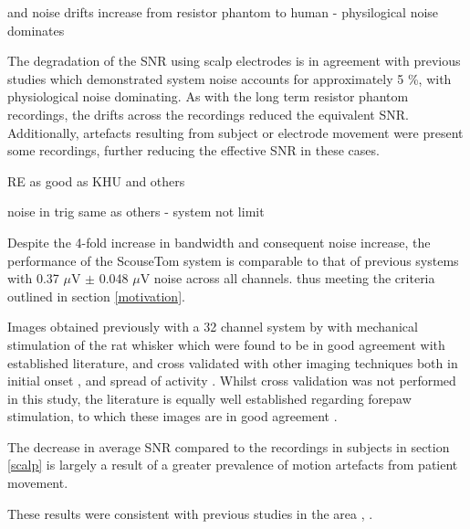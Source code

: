 and noise drifts increase from resistor phantom to human - physilogical noise dominates


 The degradation of the SNR using scalp electrodes is in agreement with previous studies \cite{fabrizi2007analysis} which demonstrated system noise accounts for approximately 5 \%, with physiological noise dominating. As with the long term resistor phantom recordings, the drifts across the recordings reduced the equivalent SNR. Additionally, artefacts resulting from subject or electrode movement were present some recordings, further reducing the effective SNR in these cases.  



RE as good as KHU and others

noise in trig same as others - system not limit



Despite the 4-fold increase in bandwidth and consequent noise increase, the performance of the ScouseTom system is comparable to that of previous systems \cite{Oh2011} with 0.37 $\mu$V $\pm$ 0.048 $\mu$V noise across all channels.
 thus meeting the criteria outlined in section \ref{motivation}.

Images obtained previously with a 32 channel system by \citet{Aristovich_2016} with mechanical stimulation of the rat whisker which were found to be in good agreement with established literature, and cross validated with other imaging techniques both in initial onset \cite{armstrong1991thalamo}, and spread of activity \cite{petersen2007functional}. Whilst cross validation was not performed in this study, the literature is equally well established regarding forepaw stimulation, to which these images are in good agreement \cite{peeters2001comparing} \cite{masamoto2007relationship} \cite{lowe2007small}.



The decrease in average SNR compared to the recordings in subjects in section \ref{scalp} is largely a result of a greater prevalence of motion artefacts from patient movement. 


These results were consistent with previous studies in the area \cite{Ranck_1963}, \cite{Logothetis_2007}.


